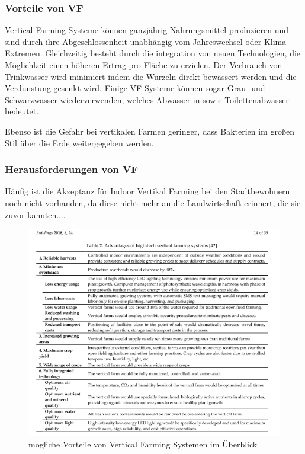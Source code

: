 \documentclass{scrartcl}
\begin{document}
\subsubsection{Vorteile von VF}

Vertical Farming Systeme können ganzjährig Nahrungsmittel produzieren und sind durch ihre Abgeschlossenheit unabhängig vom Jahreswechsel oder Klima-Extremen. Gleichzeitig besteht durch die integration von neuen Technologien, die Möglichkeit einen höheren Ertrag pro Fläche zu erzielen. Der Verbrauch von Trinkwasser wird minimiert indem die Wurzeln direkt bewässert werden und die Verdunstung gesenkt wird. Einige VF-Systeme können sogar Grau- und Schwarzwasser wiederverwenden, welches Abwasser in sowie Toilettenabwasser bedeutet. 

Ebenso ist die Gefahr bei vertikalen Farmen geringer, dass Bakterien im großen Stil über die Erde weitergegeben werden.

\subsubsection{Herausforderungen von VF}
Häufig ist die Akzeptanz für Indoor Vertikal Farming bei den Stadtbewohnern noch nicht vorhanden, da diese nicht mehr an die Landwirtschaft erinnert, die sie zuvor kannten....


\begin{figure}[htbp]
\centering
\includegraphics[width=14cm]{image_folder/moglicheVorteileVonVF.png}
\caption{mogliche Vorteile von Vertical Farming Systemen im Überblick}
\label{fig:vorteileVF}
\end{figure}
\end{document}

